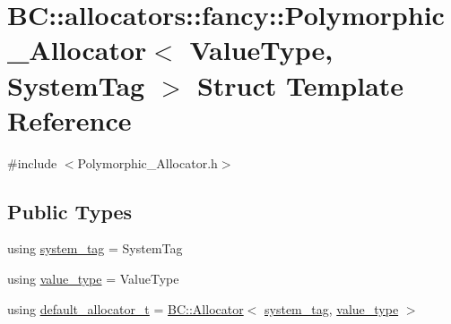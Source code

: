 \hypertarget{structBC_1_1allocators_1_1fancy_1_1Polymorphic__Allocator}{}\section{BC\+:\+:allocators\+:\+:fancy\+:\+:Polymorphic\+\_\+\+Allocator$<$ Value\+Type, System\+Tag $>$ Struct Template Reference}
\label{structBC_1_1allocators_1_1fancy_1_1Polymorphic__Allocator}


{\ttfamily \#include $<$Polymorphic\+\_\+\+Allocator.\+h$>$}

\subsection*{Public Types}
\begin{DoxyCompactItemize}
\item 
using \hyperlink{structBC_1_1allocators_1_1fancy_1_1Polymorphic__Allocator_ad36b0511200ac81edc839dc908ee65c5}{system\+\_\+tag} = System\+Tag
\item 
using \hyperlink{structBC_1_1allocators_1_1fancy_1_1Polymorphic__Allocator_a644020fa0a4109c775c0ae7de878f518}{value\+\_\+type} = Value\+Type
\item 
using \hyperlink{structBC_1_1allocators_1_1fancy_1_1Polymorphic__Allocator_ae8659fc3ca9a46797b846c0f452b2a1e}{default\+\_\+allocator\+\_\+t} = \hyperlink{namespaceBC_a934f94b17b06290e6b241e5f59930c5f}{B\+C\+::\+Allocator}$<$ \hyperlink{structBC_1_1allocators_1_1fancy_1_1Polymorphic__Allocator_ad36b0511200ac81edc839dc908ee65c5}{system\+\_\+tag}, \hyperlink{structBC_1_1allocators_1_1fancy_1_1Polymorphic__Allocator_a644020fa0a4109c775c0ae7de878f518}{value\+\_\+type} $>$
\end{DoxyCompactItemize}
